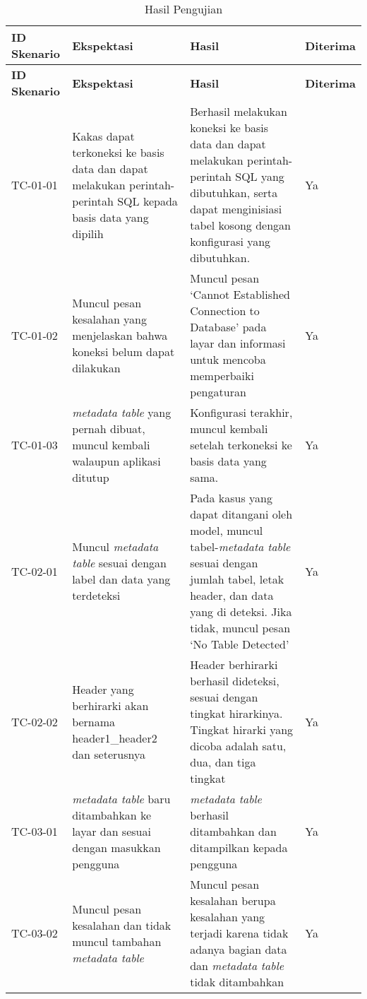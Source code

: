 \begin{small}
\begin{longtable}{ | p{2cm} | p{4cm} | p{4cm} | p{2cm} | }
    \caption{Hasil Pengujian}
    \label{HasilUji}\\ \hline
    \centering\bfseries{ID Skenario} & \centering\bfseries{Ekspektasi} & \centering\bfseries{Hasil} & \centering\bfseries{Diterima} \tabularnewline \hline
    \endfirsthead
    \hline
    \centering\bfseries{ID Skenario} & \centering\bfseries{Ekspektasi} & \centering\bfseries{Hasil} & \centering\bfseries{Diterima} \tabularnewline \hline
    \endhead
    TC-01-01 & Kakas dapat terkoneksi ke basis data dan dapat melakukan perintah-perintah SQL kepada basis data yang dipilih & Berhasil melakukan koneksi ke basis data dan dapat melakukan perintah-perintah SQL yang dibutuhkan, serta dapat menginisiasi tabel kosong dengan konfigurasi yang dibutuhkan. & Ya
	\\ \hline TC-01-02 & Muncul pesan kesalahan yang menjelaskan bahwa koneksi belum dapat dilakukan & Muncul pesan ‘Cannot Established Connection to Database’ pada layar dan informasi untuk mencoba memperbaiki pengaturan & Ya
	\\ \hline TC-01-03 & \textit{metadata table} yang pernah dibuat, muncul kembali walaupun aplikasi ditutup & Konfigurasi terakhir, muncul kembali setelah terkoneksi ke basis data yang sama. & Ya

	\\ \hline TC-02-01 & Muncul \textit{metadata table} sesuai dengan label dan data yang terdeteksi & Pada kasus yang dapat ditangani oleh model, muncul tabel-\textit{metadata table} sesuai dengan jumlah tabel, letak header, dan data yang di deteksi. Jika tidak, muncul pesan ‘No Table Detected’ & Ya
	\\ \hline TC-02-02 & Header yang berhirarki akan bernama header1\_header2 dan seterusnya & Header berhirarki berhasil dideteksi, sesuai dengan tingkat hirarkinya. Tingkat hirarki yang dicoba adalah satu, dua, dan tiga tingkat & Ya

	\\ \hline TC-03-01 & \textit{metadata table} baru ditambahkan ke layar dan sesuai dengan masukkan pengguna & \textit{metadata table} berhasil ditambahkan dan ditampilkan kepada pengguna & Ya
	\\ \hline TC-03-02 & Muncul pesan kesalahan dan tidak muncul tambahan \textit{metadata table} & Muncul pesan kesalahan berupa kesalahan yang terjadi karena tidak adanya bagian data dan \textit{metadata table} tidak ditambahkan & Ya


\end{longtable}
\end{small}
